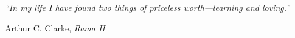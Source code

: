\pagestyle{empty} %

\null\vfill %

\textit{``In my life I have found two things of priceless worth---learning and loving.''}

\begin{flushright}
Arthur C. Clarke, \textit{Rama II}
\end{flushright}

\vfill\vfill\vfill\vfill\vfill\vfill\null %

\clearpage %
